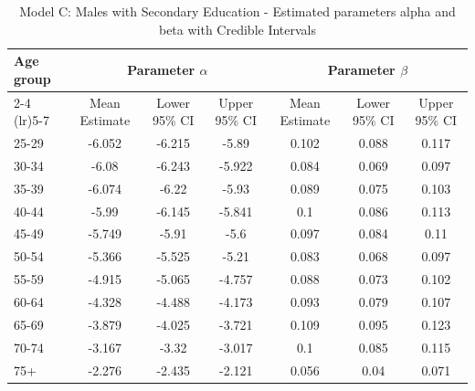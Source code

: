 \begin{landscape}
\begin{table}[htbp]
\centering
\caption{Model C: Males with Secondary Education - Estimated parameters alpha and beta  with Credible Intervals}
\label{tab:parameters_ab23}
\begin{tabular}{@{}lcccccc@{}}
\toprule
Age group & \multicolumn{3}{c}{Parameter \(\alpha\)} & \multicolumn{3}{c}{Parameter \(\beta\)} \\ 
\cmidrule(lr){2-4} \cmidrule(lr){5-7}
          & Mean Estimate & Lower 95\% CI & Upper 95\% CI & Mean Estimate & Lower 95\% CI & Upper 95\% CI \\ 
\midrule
25-29 & -6.052 & -6.215 & -5.89 & 0.102 & 0.088 & 0.117 \\
30-34 & -6.08 & -6.243 & -5.922 & 0.084 & 0.069 & 0.097 \\
35-39 & -6.074 & -6.22 & -5.93 & 0.089 & 0.075 & 0.103 \\
40-44 & -5.99 & -6.145 & -5.841 & 0.1 & 0.086 & 0.113 \\
45-49 & -5.749 & -5.91 & -5.6 & 0.097 & 0.084 & 0.11 \\
50-54 & -5.366 & -5.525 & -5.21 & 0.083 & 0.068 & 0.097 \\
55-59 & -4.915 & -5.065 & -4.757 & 0.088 & 0.073 & 0.102 \\
60-64 & -4.328 & -4.488 & -4.173 & 0.093 & 0.079 & 0.107 \\
65-69 & -3.879 & -4.025 & -3.721 & 0.109 & 0.095 & 0.123 \\
70-74 & -3.167 & -3.32 & -3.017 & 0.1 & 0.085 & 0.115 \\
75+ & -2.276 & -2.435 & -2.121 & 0.056 & 0.04 & 0.071 \\
\bottomrule
\end{tabular}
\end{table}
\end{landscape}